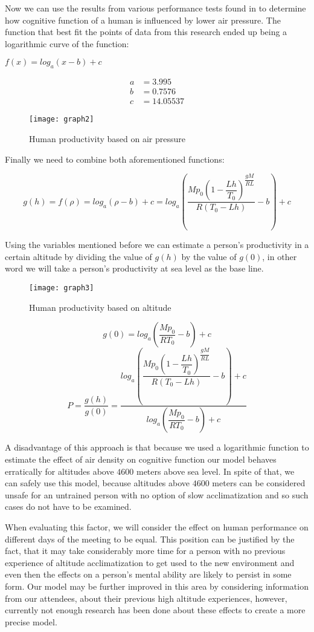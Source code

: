 Now we can use the results from various performance tests found in \cite{Research1996} to determine how cognitive function of a human is influenced by lower air pressure. The function that best fit the points of data from this research ended up being a logarithmic curve of the function:
\begin{center}
$f(x)=log_a\left(x-b\right)+c$
\end{center}
\begin{align*}
a &= 3.995\\
b &= 0.7576\\
c &= 14.05537
\end{align*}

\begin{figure}[ht]
	\centering
    	\texttt{[image: graph2]}
    \caption{Human productivity based on air pressure}
\end{figure}

Finally we need to combine both aforementioned functions:

$$g(h)=f(\rho)=log_a\left(\rho-b\right)+c=log_a\left(\dfrac{M p_0 \left(1-\dfrac{Lh}{T_0}\right)^{\dfrac{gM}{RL}}  }{ R (T_0-Lh)  }-b\right)+c$$

Using the variables mentioned before we can estimate a person's productivity in a certain altitude by dividing the value of $g(h)$ by the value of $g(0)$, in other word we will take a person's productivity at sea level as the base line. 

\begin{figure}[ht]
	\centering
    	\texttt{[image: graph3]}
    \caption{Human productivity based on altitude}
\end{figure}

$$ g(0) = log_a\left(\dfrac{M p_0 }{ R T_0  }-b\right)+c$$
$$P = \frac{g(h)}{g(0)} = \frac{ log_a\left(\dfrac{M p_0 \left(1-\dfrac{Lh}{T_0}\right)^{\dfrac{gM}{RL}}  }{ R (T_0-Lh)  }-b\right)+c }{ log_a\left(\dfrac{M p_0 }{ R T_0  }-b\right)+c }$$

A disadvantage of this approach is that because we used a logarithmic function to estimate the effect of air density on cognitive function our model behaves erratically for altitudes above $4600$ meters above sea level. In spite of that, we can safely use this model, because altitudes above $4600$ meters can be considered unsafe for an untrained person with no option of slow acclimatization and so such cases do not have to be examined.

When evaluating this factor, we will consider the effect on human performance on different days of the meeting to be equal. This position can be justified by the fact, that it may take considerably more time for a person with no previous experience of altitude acclimatization to get used to the new environment and even then the effects on a person's mental ability are likely to persist in some form. Our model may be further improved in this area by considering information from our attendees, about their previous high altitude experiences, however, currently not enough research has been done about these effects to create a more precise model.



